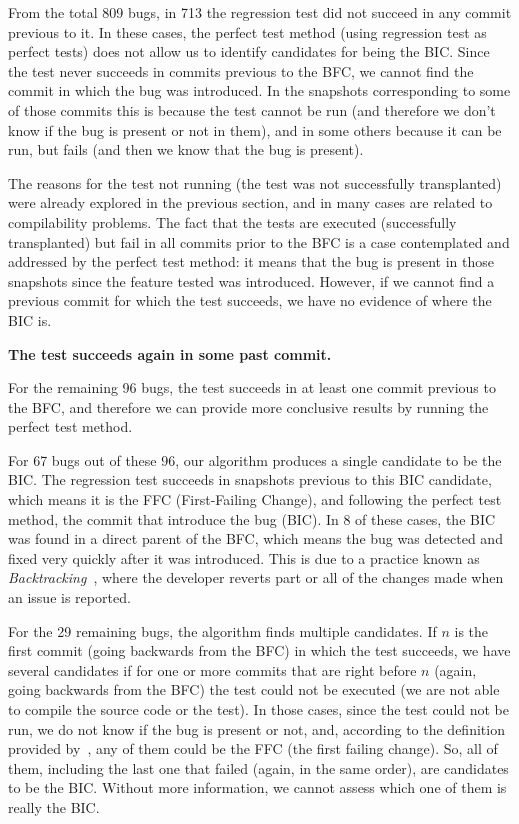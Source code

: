 From the total 809 bugs, in 713 the regression test did not succeed in any commit previous to it. 
In these cases, the perfect test method (using regression test as perfect tests) does not allow us to identify candidates for being the BIC. 
Since the test never succeeds in commits previous to the BFC, we cannot find the commit in which the bug was introduced. 
In the snapshots corresponding to some of those commits this is because the test cannot be run (and therefore we don't know if the bug is present or not in them), and in some others because it can be run, but fails (and then we know that the bug is present).

The reasons for the test not running (the test was not successfully transplanted) were already explored in the previous section, and in many cases are related to compilability problems. 
The fact that the tests are executed (successfully transplanted) but fail in all commits prior to the BFC is a case contemplated and addressed by the perfect test method: it means that the bug is present in those snapshots since the feature tested was introduced.
However, if we cannot find a previous commit for which the test succeeds, we have no evidence of where the BIC is.

\textbf{The test succeeds again in some past commit.}

For the remaining 96 bugs, the test succeeds in at least one commit previous to the BFC, and therefore we can provide more conclusive results by running the perfect test method.

For 67 bugs out of these 96, our algorithm produces a single candidate to be the BIC. 
The regression test succeeds in snapshots previous to this BIC candidate, which means it is the FFC (First-Failing Change), and following the perfect test method, the commit that introduce the bug (BIC). 
In 8 of these cases, the BIC was found in a direct parent of the BFC, which means the bug was detected and fixed very quickly after it was introduced. 
This is due to a practice known as \textit{Backtracking}~\cite{yoon2012exploratory,yoon2014longitudinal}, where the developer reverts part or all of the changes made when an issue is reported.

For the 29 remaining bugs, the algorithm finds multiple candidates. 
If $n$ is the first commit (going backwards from the BFC) in which the test succeeds, we have several candidates if for one or more commits that are right before $n$ (again, going backwards from the BFC) the test could not be executed (we are not able to compile the source code or the test).
In those cases, since the test could not be run, we do not know if the bug is present or not, and, according to the definition provided by~\gema, any of them could be the FFC (the first failing change).
So, all of them, including the last one that failed (again, in the same order), are candidates to be the BIC. 
Without more information, we cannot assess which one of them is really the BIC.


